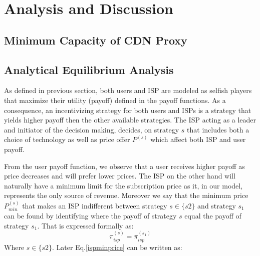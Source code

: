 \documentclass[paper]{ieice}
\begin{document}
\section{Analysis and Discussion}

\subsection{Minimum Capacity of CDN Proxy}

\subsection{Analytical Equilibrium Analysis}
As defined in previous section, both users and ISP are modeled as selfish players that maximize their utility (payoff) defined in the payoff functions.
As a consequence, an incentivizing strategy for both users and ISPs is a strategy that yields higher payoff then the other available strategies.
The ISP acting as a leader and initiator of the decision making, decides, on strategy $s$ that includes both a choice of technology as well as price offer $P^{(s)}$ which affect both ISP and user payoff.

From the user payoff function, we observe that a user receives higher payoff as price decreases and will prefer lower prices.
The ISP on the other hand will naturally have a minimum limit for the subscription price as it, in our model, represents the only source of revenue.
Moreover we say that the minimum price $P^{(s)}_{min}$ that makes an ISP indifferent between strategy $s \in \{s2\}$ and strategy $s_1$ can be found by identifying where the payoff of strategy $s$ equal the payoff of strategy $s_1$. 
That is expressed formally as:
\begin{equation}\label{ispminprice}
	\pi^{(s)}_{isp} = \pi^{(s_1)}_{isp}
\end{equation}
Where $s \in \{s2\}$. 
Later Eq.\ref{ispminprice} can be written as: 
\end{document}
